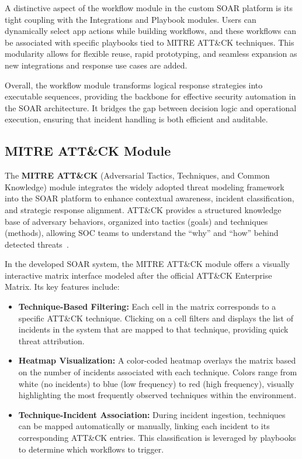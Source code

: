 A distinctive aspect of the workflow module in the custom SOAR platform is its tight coupling with the Integrations and Playbook modules. Users can dynamically select app actions while building workflows, and these workflows can be associated with specific playbooks tied to MITRE ATT\&CK techniques. This modularity allows for flexible reuse, rapid prototyping, and seamless expansion as new integrations and response use cases are added.

Overall, the workflow module transforms logical response strategies into executable sequences, providing the backbone for effective security automation in the SOAR architecture. It bridges the gap between decision logic and operational execution, ensuring that incident handling is both efficient and auditable.

\subsection{MITRE ATT\&CK Module}

The \textbf{MITRE ATT\&CK} (Adversarial Tactics, Techniques, and Common Knowledge) module integrates the widely adopted threat modeling framework into the SOAR platform to enhance contextual awareness, incident classification, and strategic response alignment. ATT\&CK provides a structured knowledge base of adversary behaviors, organized into tactics (goals) and techniques (methods), allowing SOC teams to understand the “why” and “how” behind detected threats~\cite{mitre}.

In the developed SOAR system, the MITRE ATT\&CK module offers a visually interactive matrix interface modeled after the official ATT\&CK Enterprise Matrix. Its key features include:

\begin{itemize}
    \item \textbf{Technique-Based Filtering:} Each cell in the matrix corresponds to a specific ATT\&CK technique. Clicking on a cell filters and displays the list of incidents in the system that are mapped to that technique, providing quick threat attribution.
    
    \item \textbf{Heatmap Visualization:} A color-coded heatmap overlays the matrix based on the number of incidents associated with each technique. Colors range from white (no incidents) to blue (low frequency) to red (high frequency), visually highlighting the most frequently observed techniques within the environment.
    
    \item \textbf{Technique-Incident Association:} During incident ingestion, techniques can be mapped automatically or manually, linking each incident to its corresponding ATT\&CK entries. This classification is leveraged by playbooks to determine which workflows to trigger.
\end{itemize}


